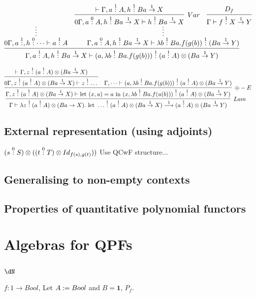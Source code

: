 \documentclass[12pt,a4paper]{article}
\begin{document}
$$ 
\infer{\Gamma, a \of{1} A, h \of{1} B a \overset{1}\to X \vdash (a, \lambda b \of{1} B a. f(g(b))) \of{1} (a \of{1} A)\otimes(B a \overset{1}\to Y)}{
  \infer*{0\Gamma, a \of{1}, h \of{0} \dots \vdash a \of{1} A}{}
  & 
\infer*{\Gamma, a \of{0} A, h \of{1} B a \overset{1}\to X \vdash \lambda b \of{1} B a. f(g(b)) \of{1} (B a \overset{1}\to Y) }{
  \infer[Var]{0\Gamma, a \of{0} A, h \of{1} B a \overset{1}\to X \vdash h \of{1} B a \overset{1} \to X}{
      \vdash \Gamma, a \of{1} A, h \of{1} B a \overset{1}\to X
    }
  & 
  \infer{\Gamma \vdash f \of{1} X \overset{1}\to Y}{
    D_f
  }
}
}
$$


$$\infer[Lam]{\Gamma \vdash \lambda z \of {1} (a \of{1} A) \otimes (B a \to X). \text{ let } \dots \of{1} (a \of{1} A) \otimes (B a \overset{1} \to X) \overset{1}\longrightarrow (a \of{1} A) \otimes (B a \overset{1} \to Y)} {
  \infer[\oplus-E]{\Gamma,  z \of{1}  (a \of{1} A) \otimes(B a \overset{1}\to X) \vdash \text{let } (x,u) = a \text{ in } (x , \lambda b \of{1} Ba. f(u(b))) \of{1} (a \of{1} A)\otimes(B a \overset{1}\to Y)   }{
    \infer{0\Gamma, z \of{1} (a \of{1} A) \otimes (B a \overset{1}\to X) \vdash  z \of{1} \dots} {
      \vdash \Gamma, z \of{1} (a \of{1} A) \otimes (B a \overset{1}\to X)
    }
    &
    \Gamma, \dots \vdash (a, \lambda b \of{1} B a. f(g(b))) \of{1} (a \of{1} A)\otimes(B a \overset{1}\to Y)
  }
}
$$

\subsection{External representation (using adjoints)}
$(s \overset{0}{:} S) \otimes ((t \overset{0}{:} T) \otimes Id_{f(s) ,g(t) })) $
Use QCwF structure... 
\subsection{Generalising to non-empty contexts}
\subsection{Properties of quantitative polynomial functors}

\section{Algebras for QPFs}

\subsection{$\dN$}
$f : 1 \to Bool$, Let $A := Bool$ and $B = \mathbf{1}$, $P_f$. 
\end{document}
